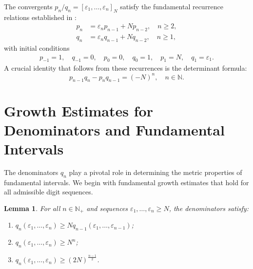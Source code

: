 \documentclass[12pt]{article}
\newtheorem{lemma}[theorem]{Lemma}
\newcommand{\N}{\mathbb{N}}
\numberwithin{equation}{section}
\begin{document}
The convergents $p_n/q_n = [\varepsilon_1, \ldots, \varepsilon_n]_N$ satisfy the fundamental recurrence relations established in \cite{Lascu2017}:
\begin{align}
p_n &= \varepsilon_n p_{n-1} + N p_{n-2}, \quad n \geq 2, \label{eq:p-recursion} \\
q_n &= \varepsilon_n q_{n-1} + N q_{n-2}, \quad n \geq 1, \label{eq:q-recursion}
\end{align}
with initial conditions
%
{
\begin{align*}
p_{-1}=1,\quad q_{-1}=0,\quad p_0=0,\quad q_0=1,\quad p_1=N,\quad q_1=\varepsilon_1.
\end{align*}
}
%
A crucial identity that follows from these recurrences is the determinant formula:
\begin{equation}
p_{n-1}q_n - p_nq_{n-1} = (-N)^n, \quad n \in \N. \label{eq:determinant}
\end{equation}

\section{Growth Estimates for Denominators and Fundamental Intervals}

The denominators $q_n$ play a pivotal role in determining the metric properties of fundamental intervals. We begin with fundamental growth estimates that hold for all admissible digit sequences.

\begin{lemma} \label{lemma:q-growth}
For all $n \in \N_+$ and sequences $\varepsilon_1, \ldots, \varepsilon_n \geq N$, the denominators satisfy:
\begin{enumerate}
\item[(i)] ${q_{n}(\varepsilon_1, \ldots, \varepsilon_n)} \ge N {q_{n-1}(\varepsilon_1, \ldots, \varepsilon_{n-1})}$;
\item[(ii)] $q_n(\varepsilon_1, \ldots, \varepsilon_n) \geq N^n$;
\item[(iii)] $q_n(\varepsilon_1, \ldots, \varepsilon_n) \geq (2N)^{\frac{n-1}{2}}$.
\end{enumerate}
\end{lemma}
\end{document}
